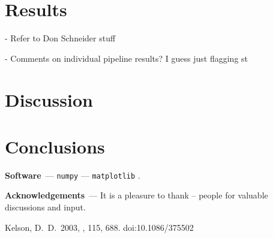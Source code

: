 \documentclass[modern]{aastex631}
\renewcommand{\paragraph}[1]{\medskip\par\noindent\textbf{#1}~---}
\begin{document}
\section{Results}\label{sec:results}

- Refer to Don Schneider stuff

- Comments on individual pipeline results? I guess just flagging st


\section{Discussion} \label{sec:discussion}


\section{Conclusions}

\paragraph{Software}
\texttt{numpy} \citep{numpy} ---
\texttt{matplotlib} \citep{matplotlib}.

\paragraph{Acknowledgements}
It is a pleasure to thank
-- people
for valuable discussions and input.

\begin{thebibliography}{dummy}
 Kelson, D.~D.\ 2003, \pasp, 115, 688. doi:10.1086/375502
\end{thebibliography}
\end{document}
